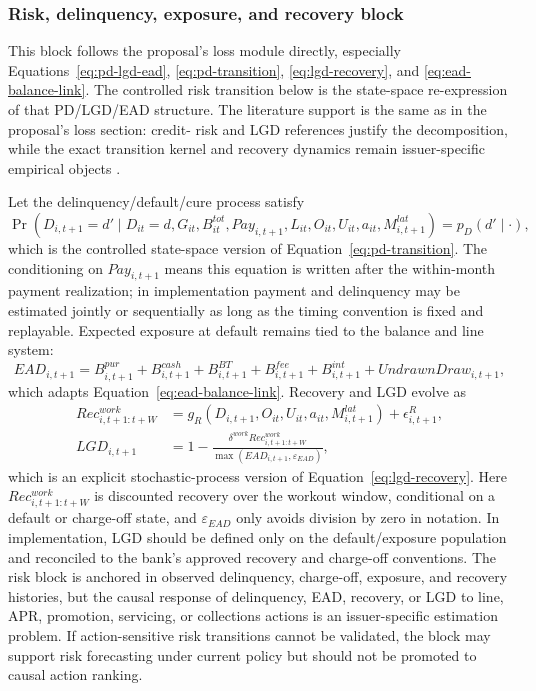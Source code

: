 \documentclass[11pt]{article}
\newcommand{\1}{\mathbf{1}}
\begin{document}
\subsubsection{Risk, delinquency, exposure, and recovery block}
\label{subsec:state-space-risk-block}

This block follows the proposal's loss module directly, especially
Equations~\eqref{eq:pd-lgd-ead}, \eqref{eq:pd-transition},
\eqref{eq:lgd-recovery}, and \eqref{eq:ead-balance-link}. The controlled risk
transition below is the state-space re-expression of that PD/LGD/EAD structure.
The literature support is the same as in the proposal's loss section: credit-
risk and LGD references justify the decomposition, while the exact transition
kernel and recovery dynamics remain issuer-specific empirical objects
\citep{hand1997credit,thomas2000survey,lessmann2015benchmarking,
schuermann2004lgd}.

Let the delinquency/default/cure process satisfy
\begin{equation}
  \Pr(D_{i,t+1}=d'\mid D_{it}=d,G_{it},B^{tot}_{it},Pay_{i,t+1},L_{it},O_{it},U_{it},a_{it},M^{lat}_{i,t+1})
  = p_D(d'\mid\cdot),
  \label{eq:ss-delinquency-transition}
\end{equation}
which is the controlled state-space version of Equation~\eqref{eq:pd-transition}.
The conditioning on $Pay_{i,t+1}$ means this equation is written after the
within-month payment realization; in implementation payment and delinquency may
be estimated jointly or sequentially as long as the timing convention is fixed
and replayable.
Expected exposure at default remains tied to the balance and line system:
\begin{equation}
  EAD_{i,t+1}
  =
  B^{pur}_{i,t+1}+B^{cash}_{i,t+1}+B^{BT}_{i,t+1}+B^{fee}_{i,t+1}+B^{int}_{i,t+1}
  + UndrawnDraw_{i,t+1},
  \label{eq:ss-ead-identity}
\end{equation}
which adapts Equation~\eqref{eq:ead-balance-link}. Recovery and LGD evolve as
\begin{align}
  Rec^{work}_{i,t+1:t+W}
    &= g_R(D_{i,t+1},O_{it},U_{it},a_{it},M^{lat}_{i,t+1})
       + \epsilon^R_{i,t+1},
       \label{eq:ss-recovery-transition}\\
  LGD_{i,t+1}
    &=
    1-\frac{\delta^{work}Rec^{work}_{i,t+1:t+W}}
            {\max(EAD_{i,t+1},\varepsilon_{EAD})},
       \label{eq:ss-lgd-identity}
\end{align}
which is an explicit stochastic-process version of Equation~\eqref{eq:lgd-recovery}.
Here $Rec^{work}_{i,t+1:t+W}$ is discounted recovery over the workout window,
conditional on a default or charge-off state, and $\varepsilon_{EAD}$ only avoids
division by zero in notation. In implementation, LGD should be defined only on
the default/exposure population and reconciled to the bank's approved recovery
and charge-off conventions.
The risk block is anchored in observed delinquency, charge-off, exposure, and
recovery histories, but the causal response of delinquency, EAD, recovery, or
LGD to line, APR, promotion, servicing, or collections actions is an
issuer-specific estimation problem. If action-sensitive risk transitions cannot
be validated, the block may support risk forecasting under current policy but
should not be promoted to causal action ranking.
\end{document}
